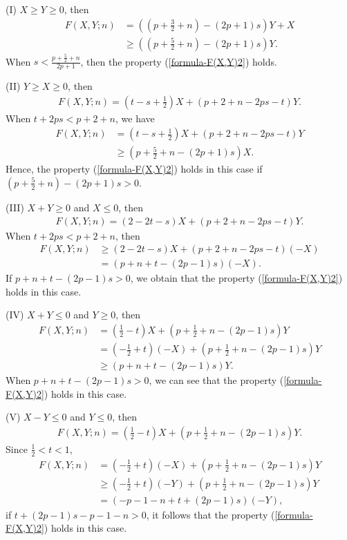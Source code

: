 \documentclass[12pt]{amsart}
\begin{document}
  
(I) $X\geq Y\geq 0$, then
\begin{align}
    F(X,Y;n)&=\left(\left(p+\frac{3}{2}+n\right)-(2p+1)s\right)Y+X\\\nonumber
  &\geq \left(\left(p+\frac{5}{2}+n\right)-(2p+1)s\right)Y.  
\end{align}
When $s<\frac{p+\frac{5}{2}+n}{2p+1}$, then the property (\ref{formula-F(X,Y)2}) holds. 


(II) $Y\geq X\geq 0$, then
\begin{align}
     F(X,Y;n)=\left(t-s+\frac{1}{2}\right)X+(p+2+n-2ps-t)Y.
\end{align}
When $t+2ps<p+2+n$, we have
\begin{align}
     F(X,Y;n)&=\left(t-s+\frac{1}{2}\right)X+(p+2+n-2ps-t)Y\\\nonumber
    &\geq \left(p+\frac{5}{2}+n-(2p+1)s\right)X.
\end{align}
Hence, the property (\ref{formula-F(X,Y)2}) holds in this case if  $\left(p+\frac{5}{2}+n\right)-(2p+1)s>0$. 


(III) $X+Y\geq 0$ and $X\leq 0$, then
\begin{align}
     F(X,Y;n)=\left(2-2t-s\right)X+(p+2+n-2ps-t)Y.
\end{align}
When $t+2ps<p+2+n$, then 
\begin{align}
     F(X,Y;n)&\geq \left(2-2t-s\right)X+(p+2+n-2ps-t)(-X) \\\nonumber
    &=(p+n+t-(2p-1)s)(-X).
\end{align}
If $p+n+t-(2p-1)s>0$, 
we obtain that the property (\ref{formula-F(X,Y)2}) holds in this case. 

(IV) $X+Y\leq 0$ and $Y\geq 0$, then 
\begin{align}
     F(X,Y;n)&=\left(\frac{1}{2}-t\right)X+\left(p+\frac{1}{2}+n-(2p-1)s\right)Y\\\nonumber
     &=\left(-\frac{1}{2}+t\right)(-X)+\left(p+\frac{1}{2}+n-(2p-1)s\right)Y\\\nonumber
    &\geq (p+n+t-(2p-1)s)Y.
\end{align}
When $p+n+t-(2p-1)s>0$, we can see that the property (\ref{formula-F(X,Y)2}) holds in this case. 



(V) $X-Y\leq 0$ and $Y\leq 0$, then 
\begin{align}
     F(X,Y;n)=\left(\frac{1}{2}-t\right)X+\left(p+\frac{1}{2}+n-(2p-1)s\right)Y.
\end{align}
Since $\frac{1}{2}<t<1$, 
\begin{align}
     F(X,Y;n)&=\left(-\frac{1}{2}+t\right)(-X)+\left(p+\frac{1}{2}+n-(2p-1)s\right)Y\\\nonumber
    &\geq \left(-\frac{1}{2}+t\right)(-Y)+\left(p+\frac{1}{2}+n-(2p-1)s\right)Y\\\nonumber
    &=(-p-1-n+t+(2p-1)s)(-Y),
\end{align}
if $t+(2p-1)s-p-1-n>0$, it follows that the property (\ref{formula-F(X,Y)2}) holds in this case. 
\end{document}
